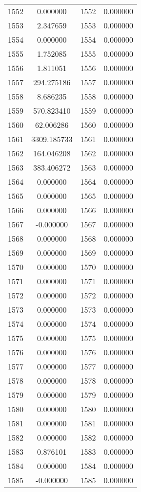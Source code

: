 \documentclass[12pt]{article}
\begin{document}
\begin{longtable}{@{}cccc@{}}
1552 & 0.000000 & 1552 & 0.000000 \\
1553 & 2.347659 & 1553 & 0.000000 \\
1554 & 0.000000 & 1554 & 0.000000 \\
1555 & 1.752085 & 1555 & 0.000000 \\
1556 & 1.811051 & 1556 & 0.000000 \\
1557 & 294.275186 & 1557 & 0.000000 \\
1558 & 8.686235 & 1558 & 0.000000 \\
1559 & 570.823410 & 1559 & 0.000000 \\
1560 & 62.006286 & 1560 & 0.000000 \\
1561 & 3309.185733 & 1561 & 0.000000 \\
1562 & 164.046208 & 1562 & 0.000000 \\
1563 & 383.406272 & 1563 & 0.000000 \\
1564 & 0.000000 & 1564 & 0.000000 \\
1565 & 0.000000 & 1565 & 0.000000 \\
1566 & 0.000000 & 1566 & 0.000000 \\
1567 & -0.000000 & 1567 & 0.000000 \\
1568 & 0.000000 & 1568 & 0.000000 \\
1569 & 0.000000 & 1569 & 0.000000 \\
1570 & 0.000000 & 1570 & 0.000000 \\
1571 & 0.000000 & 1571 & 0.000000 \\
1572 & 0.000000 & 1572 & 0.000000 \\
1573 & 0.000000 & 1573 & 0.000000 \\
1574 & 0.000000 & 1574 & 0.000000 \\
1575 & 0.000000 & 1575 & 0.000000 \\
1576 & 0.000000 & 1576 & 0.000000 \\
1577 & 0.000000 & 1577 & 0.000000 \\
1578 & 0.000000 & 1578 & 0.000000 \\
1579 & 0.000000 & 1579 & 0.000000 \\
1580 & 0.000000 & 1580 & 0.000000 \\
1581 & 0.000000 & 1581 & 0.000000 \\
1582 & 0.000000 & 1582 & 0.000000 \\
1583 & 0.876101 & 1583 & 0.000000 \\
1584 & 0.000000 & 1584 & 0.000000 \\
1585 & -0.000000 & 1585 & 0.000000 \\

\end{longtable}
\end{document}
